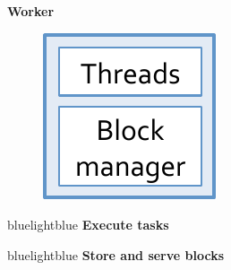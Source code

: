 {\begin{columns}[t, onlytextwidth]
	\begin{column}[T]{.2\textwidth}
		\begin{center}
			{ \tiny \bf Worker}
		\end{center}			
		\begin{figure}[h]
			\includegraphics[scale=0.5]{./Figures/Worker}
		\end{figure}
		\vspace{10pt}

		\begin{colorblock}{blue}{lightblue}{ }
			{\tiny \bf Execute tasks}
		\end{colorblock}

		\vspace{10pt}

		\begin{colorblock}{blue}{lightblue}{ }
			{\tiny \bf Store and serve blocks}
		\end{colorblock}			
	\end{column}
\end{columns}
}

